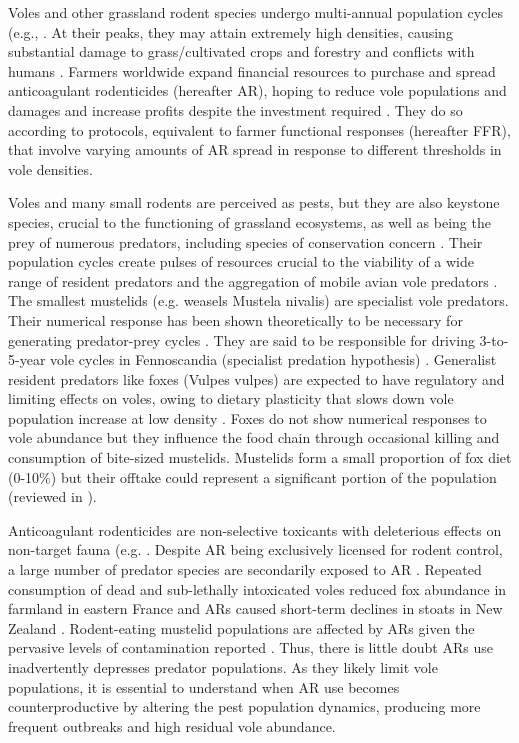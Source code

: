 \documentclass[11pt]{article}
\begin{document}
Voles and other grassland rodent species undergo multi-annual population cycles (e.g.,  \cite{Krebs2013}. At their peaks, they may attain extremely high densities, causing substantial damage to grass/cultivated crops and forestry and conflicts with humans \citep{Delattre2009}. Farmers worldwide expand financial resources to purchase and spread anticoagulant rodenticides (hereafter AR), hoping to reduce vole populations and damages and increase profits despite the investment required \citep{Stenseth2003}. They do so according to protocols, equivalent to farmer functional responses (hereafter FFR), that involve varying amounts of AR spread in response to different thresholds in vole densities. 

Voles and many small rodents are perceived as pests, but they are also keystone species, crucial to the functioning of grassland ecosystems, as well as being the prey of numerous predators, including species of conservation concern \citep{Delibes-Mateos2011, Coeurdassier2014}. Their population cycles create pulses of resources crucial to the viability of a wide range of resident predators and the aggregation of mobile avian vole predators \citep{Korpimaki1991}. The smallest mustelids (e.g. weasels Mustela nivalis) are specialist vole predators. Their numerical response has been shown theoretically to be necessary for generating predator-prey cycles \citep{Hanski1991}. They are said to be responsible for driving 3-to-5-year vole cycles in Fennoscandia (specialist predation hypothesis) \citet{Hanski1991}. Generalist resident predators like foxes (Vulpes vulpes) are expected to have regulatory and limiting effects on voles, owing to dietary plasticity that slows down vole population increase at low density \citet{Hanski1991}. Foxes do not show numerical responses to vole abundance \citep{Weber2002} but they influence the food chain through occasional killing and consumption of bite-sized mustelids. Mustelids form a small proportion of fox diet (0-10\%) but their offtake could represent a significant portion of the population (reviewed in \citet{Lambin2018}).

Anticoagulant rodenticides are non-selective toxicants with deleterious effects on non-target fauna (e.g. \cite{Coeurdassier2014}. Despite AR being exclusively licensed for rodent control, a large number of predator species are secondarily exposed to AR \citep{Sanchez-Barbudo2012}. Repeated consumption of dead and sub-lethally intoxicated voles reduced fox abundance in farmland in eastern France \citep{Jacquot2013} and ARs caused short-term declines in stoats in New Zealand \citep{Alterio1996}. Rodent-eating mustelid populations are affected by ARs given the pervasive levels of contamination reported \citep{McDonald1998}. Thus, there is little doubt ARs use inadvertently depresses predator populations. As they likely limit vole populations, it is essential to understand when AR use becomes counterproductive by altering the pest population dynamics, producing more frequent outbreaks and high residual vole abundance.
\end{document}
